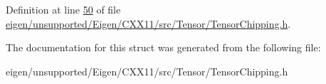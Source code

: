 Definition at line \hyperlink{eigen_2unsupported_2_eigen_2_c_x_x11_2src_2_tensor_2_tensor_chipping_8h_source_l00050}{50} of file \hyperlink{eigen_2unsupported_2_eigen_2_c_x_x11_2src_2_tensor_2_tensor_chipping_8h_source}{eigen/unsupported/\+Eigen/\+C\+X\+X11/src/\+Tensor/\+Tensor\+Chipping.\+h}.



The documentation for this struct was generated from the following file\+:\begin{DoxyCompactItemize}
\item 
eigen/unsupported/\+Eigen/\+C\+X\+X11/src/\+Tensor/\+Tensor\+Chipping.\+h\end{DoxyCompactItemize}

